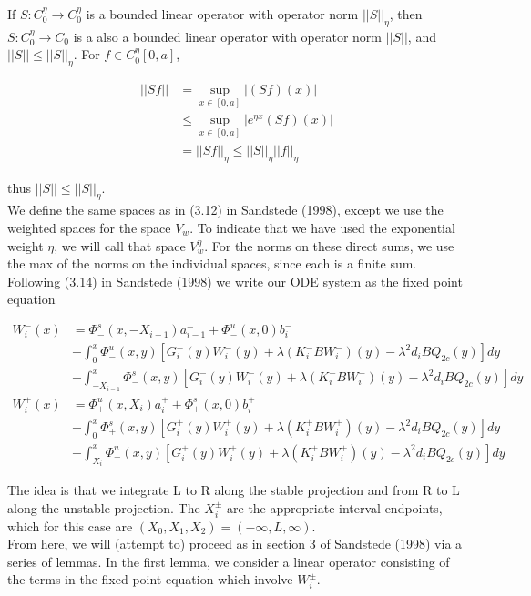 \documentclass[12pt]{article}
\begin{document}
If $S: C_0^\eta \rightarrow C_0^\eta$ is a bounded linear operator with operator norm $||S||_\eta$, then $S: C_0^\eta \rightarrow C_0$ is a also a bounded linear operator with operator norm $||S||$, and $||S|| \leq ||S||_\eta$. For $f \in C_0^\eta[0,a]$,

\begin{align*}
||S f|| &= \sup_{x \in [0,a]} | (S f)(x) | \\
& \leq \sup_{x \in [0,a]} | e^{\eta x} (S f)(x) | \\
&= || S f ||_\eta \leq ||S||_\eta ||f||_\eta
\end{align*}

thus $||S|| \leq ||S||_\eta$.\\
 
We define the same spaces as in (3.12) in Sandstede (1998), except we use the weighted spaces for the space $V_w$. To indicate that we have used the exponential weight $\eta$, we will call that space $V_w^\eta$. For the norms on these direct sums, we use the max of the norms on the individual spaces, since each is a finite sum.\\

Following (3.14) in Sandstede (1998) we write our ODE system as the fixed point equation

\begin{align*}
W_i^-(x) &= \Phi^s_-(x, -X_{i-1})a^-_{i-1} + \Phi^u_-(x, 0)b_i^- \\
&+ \int_0^x \Phi^u_-(x, y)[G_i^-(y) W_i^-(y) + \lambda (K_i^- B W_i^-)(y) - \lambda^2 d_i B Q_{2c}(y) ] dy \\
&+ \int_{-X_{i-1}}^x \Phi^s_-(x, y)[G_i^-(y) W_i^-(y) + \lambda (K_i^-B W_i^-)(y) - \lambda^2 d_i B Q_{2c}(y) ] dy \\
W_i^+(x) &= \Phi^u_+(x, X_i)a^+_{i} + \Phi^s_+(x, 0)b_i^+ \\
&+ \int_0^x \Phi^s_+(x, y)[G_i^+(y) W_i^+(y) + \lambda (K_i^+ B W_i^+)(y) - \lambda^2 d_i B Q_{2c}(y) ] dy \\
&+ \int_{X_{i}}^x \Phi^u_+(x, y)[G_i^+(y) W_i^+(y) + \lambda (K_i^+ B W_i^+)(y) - \lambda^2 d_i B Q_{2c}(y) ] dy
\end{align*}

The idea is that we integrate L to R along the stable projection and from R to L along the unstable projection. The $X_i^\pm$ are the appropriate interval endpoints, which for this case are $(X_0, X_1, X_2) = (-\infty, L, \infty)$.\\

From here, we will (attempt to) proceed as in section 3 of Sandstede (1998) via a series of lemmas. In the first lemma, we consider a linear operator consisting of the terms in the fixed point equation which involve $W_i^\pm$. 
\end{document}

